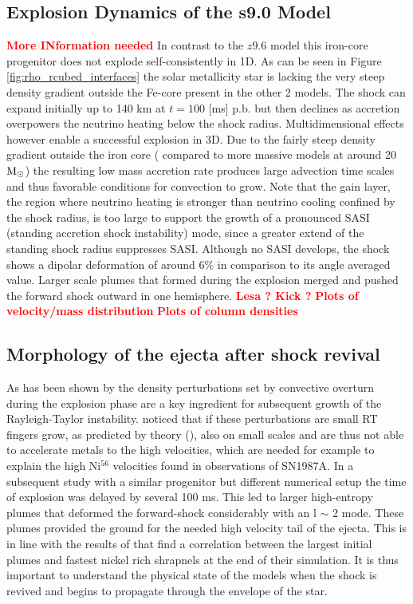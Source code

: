 \documentclass[fleqn,usenatbib]{mnras}
\newcommand{\nickel}{$\mathrm{Ni^{56}}$\xspace}
\newcommand{\solm}{\xspace\ensuremath{\rm{M_{\odot}}}}
\begin{document}
\subsection{Explosion Dynamics of the s9.0 Model}
\textcolor{red}{\textbf{More INformation needed}}
In contrast to the $z9.6$ model this iron-core progenitor does not explode self-consistently in 1D. As can be seen in Figure \ref{fig:rho_rcubed_interfaces} the solar metallicity star is lacking the very steep density gradient outside the Fe-core present in the other 2 models. The shock can expand initially up to 140 km at $t=100$ [ms] p.b. but then declines as accretion overpowers the neutrino heating below the shock radius. 
Multidimensional effects however enable a successful explosion in 3D.  Due to the fairly steep density gradient outside the iron core ( compared to more massive models at around 20\solm) the resulting low mass accretion rate produces large advection time scales and thus favorable conditions for convection to grow. Note that the gain layer, the region where neutrino heating is stronger than neutrino cooling confined by the shock radius,  is too large to support the growth of a pronounced SASI (standing accretion shock instability) mode, since a greater extend of the standing shock radius suppresses SASI. Although no SASI develops, the shock shows a dipolar deformation of around 6\% in comparison to its angle averaged value. Larger scale plumes that formed during the explosion merged and pushed the forward shock outward in one hemisphere. 
\textcolor{red}{\textbf{Lesa ? Kick ?}}
\textcolor{red}{\textbf{Plots of velocity/mass distribution}}
\textcolor{red}{\textbf{Plots of column densities}}

\subsection{Morphology of the ejecta after shock revival}
\label{subsec:Morphology of the ejecta after shock revival}

As has been shown by \cite{Kifonidis2003} the density perturbations set by convective overturn during the explosion phase are a key ingredient for subsequent growth of the Rayleigh-Taylor instability. \cite{Kifonidis2003}  noticed that if these perturbations are small RT fingers grow, as predicted by theory (\cite{Chandrasekhar1961}), also on small scales and are thus not able to accelerate metals to the high velocities, which are needed for example to explain the high \nickel velocities found in observations of SN1987A. In a subsequent study with a similar progenitor but different numerical setup the time of explosion was delayed by several 100 ms. This led to larger high-entropy plumes that deformed the forward-shock considerably with an l $\sim$ 2 mode. These plumes provided the ground for the needed high velocity tail of the ejecta. This is in line with the results of \citet{Wongwathanarat2015} that find a correlation between the largest initial plumes and fastest nickel rich shrapnels at the end of their simulation. It is thus important to understand the physical state of the models when the shock is revived and begins to propagate through the envelope of the star.
\end{document}
